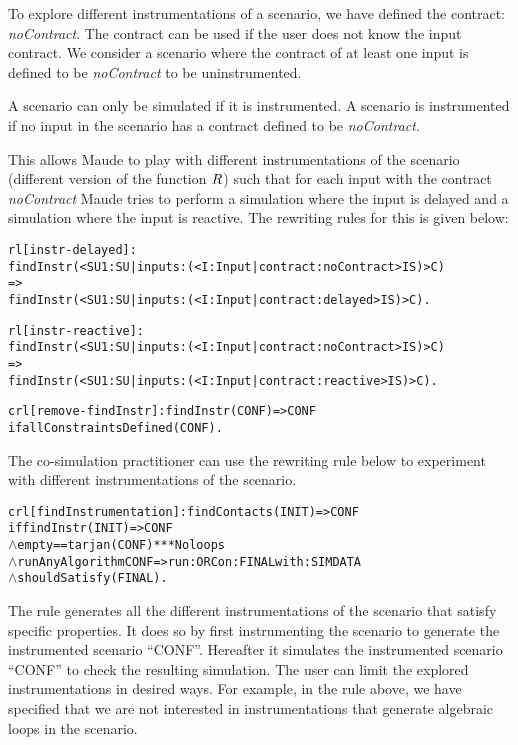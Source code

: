 To explore different instrumentations of a scenario, we have defined the contract: \textit{noContract}.
The contract can be used if the user does not know the input contract.
We consider a scenario where the contract of at least one input is defined to be \textit{noContract} to be uninstrumented.

A scenario can only be simulated if it is instrumented.
A scenario is instrumented if no input in the scenario has a contract defined to be \textit{noContract}.


This allows Maude to play with different instrumentations of the scenario (different version of the function $R$) such that for each input with the contract \textit{noContract} Maude tries to perform a simulation where the input is delayed and a simulation where the input is reactive.
The rewriting rules for this is given below:
\begin{alltt}
  \small
rl [instr-delayed]: 
findInstr(< SU1 : SU | inputs : (< I : Input | contract : noContract > IS) > C)
=>
findInstr(< SU1 : SU | inputs : (< I : Input | contract : delayed > IS) > C) .

rl [instr-reactive]: 
findInstr(< SU1 : SU | inputs : (< I : Input | contract : noContract > IS) > C)
=>
findInstr(< SU1 : SU | inputs : (< I : Input | contract : reactive > IS) > C) .

crl [remove-findInstr]: findInstr(CONF) => CONF 
  if allConstraintsDefined(CONF) .
\end{alltt}

The co-simulation practitioner can use the rewriting rule below to experiment with different instrumentations of the scenario.

\begin{alltt}
  \small
  crl [findInstrumentation]: findContacts(INIT) => CONF
      if findInstr(INIT) => CONF
      \(\land\) empty == tarjan(CONF) *** No loops
      \(\land\) runAnyAlgorithm CONF => run: ORC on: FINAL with: SIMDATA
      \(\land\) shouldSatisfy(FINAL) .
  \end{alltt}

The rule generates all the different instrumentations of the scenario that satisfy specific properties.
It does so by first instrumenting the scenario to generate the instrumented scenario ``CONF''.
Hereafter it simulates the instrumented scenario ``CONF'' to check the resulting simulation.
The user can limit the explored instrumentations in desired ways.
For example, in the rule above, we have specified that we are not interested in instrumentations that generate algebraic loops in the scenario.

